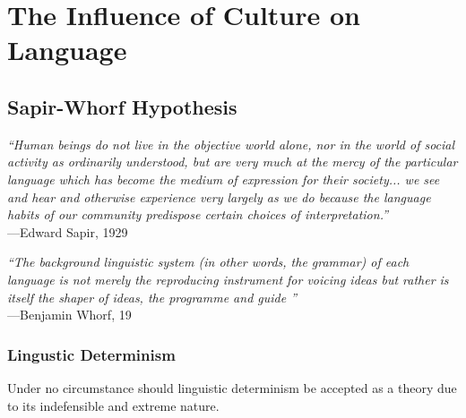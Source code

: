 \documentclass[../main.tex]{subfiles}
\begin{document}
    \section{The Influence of Culture on Language}
    \subsection{Sapir-Whorf Hypothesis}
        {\it ``Human beings do not live in the objective world alone, nor in the world of social activity as ordinarily understood, but are very much at the mercy of the particular language which has become the medium of expression for their society... we see and hear and otherwise experience very largely as we do because the language habits of our community predispose certain choices of interpretation.''} \\ \hfill ---Edward Sapir, 1929 \par 
        {\it ``The background linguistic system (in other words, the grammar) of each language is not merely the reproducing instrument for voicing ideas but rather is itself the shaper of ideas, the programme and guide ''} \\ \hfill ---Benjamin Whorf, 19 \par 
        
        \subsubsection{Lingustic Determinism}
            Under no circumstance should linguistic determinism be accepted as a theory due to its indefensible and extreme nature.
        
\end{document}
